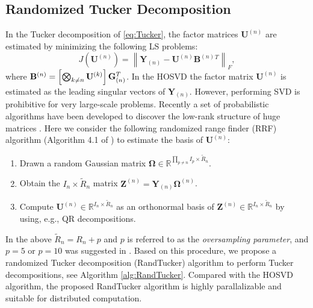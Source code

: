 \documentclass[10pt,twocolumn,twoside]{IEEEtran}
\newcommand{\mat}[1]{\ensuremath{\mathbf{#1}}}
\newcommand{\tenmat}[2][n]{\ensuremath{{\mathbf{#2}}_{(#1)}}}
\newcommand{\matn}[2][n]{\ensuremath{\mathbf{#2}^{(#1)}}}
\newcommand{\Real}{\ensuremath{\mathbb{R}}}
\newcommand{\frob}[2][F]{\ensuremath{\left\|#2\right\|_{#1}}}
\begin{document}
\subsection{Randomized Tucker Decomposition}
\label{sec:RandTucker}
In the Tucker decomposition of \eqref{eq:Tucker}, the factor matrices \matn{U} are estimated by minimizing the following LS problems:
\begin{equation}
\label{eq:TuckerLS}
J(\matn{U})=\frob{\tenmat{Y}-\matn{U}\matn{B}{}^T},
\end{equation}
where $\matn{B}=\left[\bigkkp\nolimits_{k\neq n}\matn[k]{U}\right]\tenmat{G}^T$.
In the HOSVD \cite{HOSVD2000} the factor matrix \matn{U} is estimated as the leading singular vectors of \tenmat{Y}. However, performing SVD is prohibitive for very large-scale problems.  Recently a set of probabilistic  algorithms have been developed to discover the low-rank structure of huge matrices \cite{siam_probLowRank}. Here we consider the following randomized range finder (RRF) algorithm (Algorithm 4.1 of \cite{siam_probLowRank}) to estimate the basis of \matn{U}:
\begin{enumerate}
\item Drawn a random Gaussian matrix $\mat{\Omega}\in\Real^{\prod_{p\neq n}I_p\times \tilde{R}_n}$.
\item Obtain the $I_n\times \tilde{R}_n$ matrix $\matn{Z}=\tenmat{Y}\matn{\Omega}$.
\item Compute $\matn{U}\in\Real^{I_n\times\tilde{R}_n}$ as an orthonormal basis of $\matn{Z}\in\Real^{I_n\times\tilde{R}_n}$ by using, e.g., QR decompositions.
\end{enumerate}
In the above $\tilde{R}_n=R_n+p$  and $p$ is referred to as the \emph{oversampling parameter}, and $p=5$ or $p=10$ was suggested in \cite{siam_probLowRank}. Based on this procedure, we propose a randomized Tucker decomposition (RandTucker) algorithm to perform Tucker decompositions, see Algorithm \ref{alg:RandTucker}. Compared with the HOSVD algorithm, the proposed RandTucker algorithm is highly parallalizable and suitable for distributed computation.
\end{document}
